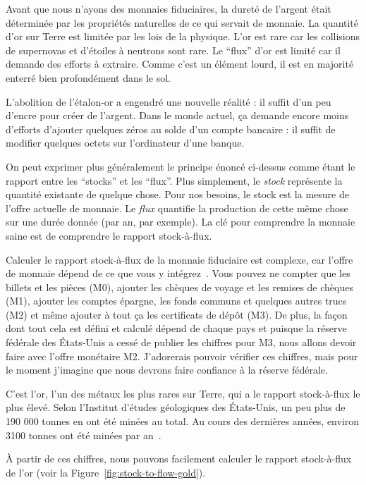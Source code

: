 Avant que nous n'ayons des monnaies fiduciaires, la dureté de l'argent était
déterminée par les propriétés naturelles de ce qui servait de monnaie. La
quantité d'or sur Terre est limitée par les lois de la physique. L'or est rare
car les collisions de supernovas et d'étoiles à neutrons sont rare. Le
\enquote{flux} d'or est limité car il demande des efforts à extraire. Comme
c'est un élément lourd, il est en majorité enterré bien profondément dans le
sol.

L'abolition de l'étalon-or a engendré une nouvelle réalité : il suffit d'un peu
d'encre pour créer de l'argent. Dans le monde actuel, ça demande encore moins
d'efforts d'ajouter quelques zéros au solde d'un compte bancaire : il suffit de
modifier quelques octets sur l'ordinateur d'une banque.

On peut exprimer plus généralement le principe énoncé ci-dessus comme étant le
rapport entre les \enquote{stocks} et les \enquote{flux}. Plus simplement, le
\textit{stock} représente la quantité existante de quelque chose. Pour nos
besoins, le stock est la mesure de l'offre actuelle de monnaie. Le \textit{flux}
quantifie la production de cette même chose sur une durée donnée (par an, par
exemple). La clé pour comprendre la monnaie saine est de comprendre le rapport
stock-à-flux.

Calculer le rapport stock-à-flux de la monnaie fiduciaire est complexe, car
l'offre de monnaie dépend de ce que vous y intégrez~\cite{wiki:money-supply}.
Vous pouvez ne compter que les billets et les pièces (M0), ajouter les chèques
de voyage et les remises de chèques (M1), ajouter les comptes épargne, les fonds
communs et quelques autres trucs (M2) et même ajouter à tout ça les certificats
de dépôt (M3). De plus, la façon dont tout cela est défini et calculé dépend de
chaque pays et puisque la réserve fédérale des États-Unis a cessé de publier
\cite{web:fed-m3} les chiffres pour M3, nous allons devoir faire avec l'offre
monétaire M2. J'adorerais pouvoir vérifier ces chiffres, mais pour le moment
j'imagine que nous devrons faire confiance à la réserve fédérale.

C'est l'or, l'un des métaux les plus rares sur Terre, qui a le rapport
stock-à-flux le plus élevé. Selon l'Institut d'études géologiques des
États-Unis, un peu plus de 190 000 tonnes en ont été minées au total. Au cours
des dernières années, environ 3100 tonnes ont été minées par
an~\cite{mineral-commodity-summaries}.

À partir de ces chiffres, nous pouvons facilement calculer le rapport
stock-à-flux de l'or (voir la Figure~\ref{fig:stock-to-flow-gold}).

